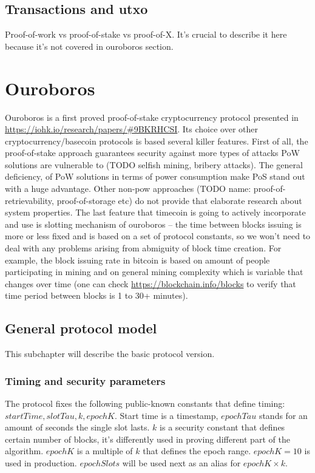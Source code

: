 \documentclass[]{itmo-student-thesis}
\begin{document}
\subsection{Transactions and utxo}

Proof-of-work vs proof-of-stake vs proof-of-X.  It’s crucial to
describe it here because it’s not covered in ouroboros section.

\section{Ouroboros}

Ouroboros is a first proved proof-of-stake cryptocurrency protocol
presented in \url{https://iohk.io/research/papers/#9BKRHCSI}. Its
choice over other cryptocurrency/basecoin protocols is based several
killer features. First of all, the proof-of-stake approach guarantees
security against more types of attacks PoW solutions are vulnerable to
(TODO selfish mining, bribery attacks). The general deficiency, of PoW
solutions in terms of power consumption make PoS stand out with a huge
advantage. Other non-pow approaches (TODO name:
proof-of-retrievability, proof-of-storage etc) do not provide that
elaborate research about system properties. The last feature that
timecoin is going to actively incorporate and use is slotting
mechanism of ouroboros -- the time between blocks issuing is more or
less fixed and is based on a set of protocol constants, so we won’t
need to deal with any problems arising from abmiguity of block time
creation. For example, the block issuing rate in bitcoin is based on
amount of people participating in mining and on general mining
complexity which is variable that changes over time (one can check
\url{https://blockchain.info/blocks} to verify that time period between
blocks is 1 to 30+ minutes).

\subsection{General protocol model}

This subchapter will describe the basic protocol version.

\subsubsection{Timing and security parameters}

The protocol fixes the following public-known constants that define
timing: $startTime, slotTau, k, epochK$. Start time is a timestamp,
$epochTau$ stands for an amount of seconds the single slot lasts. $k$ is
a security constant that defines certain number of blocks, it’s
differently used in proving different part of the algorithm. $epochK$
is a multiple of $k$ that defines the epoch range. $epochK = 10$ is
used in production. $epochSlots$ will be used next as an alias for
$epochK \times k$.
\end{document}
